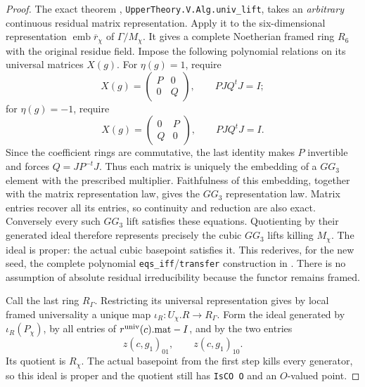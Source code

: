 \begin{proof}
The exact theorem
,
\texttt{UpperTheory.V.Alg.univ\_lift}, takes an
\emph{arbitrary} continuous residual matrix representation.
Apply it to the six-dimensional representation
$\operatorname{emb}\overline r_\chi$ of $\Gamma/M_\chi$.
It gives a complete Noetherian framed ring $R_6$ with the
original residue field.  Impose the following polynomial
relations on its universal matrices $X(g)$.
For $\eta(g)=1$, require
\[
 X(g)=\begin{pmatrix}P&0\\0&Q\end{pmatrix},
                  \qquad P JQ^tJ=I;
                                                                  \tag{G49.8}
\]
for $\eta(g)=-1$, require
\[
 X(g)=\begin{pmatrix}0&P\\Q&0\end{pmatrix},
                  \qquad P JQ^tJ=I.                            \tag{G49.9}
\]
Since the coefficient rings are commutative, the last
identity makes $P$ invertible and forces $Q=JP^{-t}J$.
Thus each matrix is uniquely the embedding of a $GG_3$
element with the prescribed multiplier.  Faithfulness of
this embedding, together with the matrix representation
law, gives the $GG_3$ representation law.  Matrix entries
recover all its entries, so continuity and reduction are
also exact.  Conversely every such $GG_3$ lift satisfies
these equations.  Quotienting by their generated ideal
therefore represents precisely the cubic $GG_3$ lifts
killing $M_\chi$.  The ideal is proper: the actual cubic
basepoint satisfies it.  This rederives, for the new seed,
the complete polynomial \texttt{eqs\_iff}/\texttt{transfer}
construction in .
There is no assumption of absolute residual irreducibility
because the functor remains framed.

Call the last ring $R_\Gamma$.  Restricting its universal
representation gives by local framed universality a unique
map $\iota_R:U_\chi.R\to R_\Gamma$.
Form the ideal generated by $\iota_R(P_\chi)$, by all entries
of $r^{\rm univ}(c).\mathrm{mat}-I$, and by the two entries
\[
                   z(c,g_1)_{01},\qquad z(c,g_1)_{10}.          \tag{G49.10}
\]
Its quotient is $R_\chi$.
The actual basepoint from the first step kills every generator,
so this ideal is proper and the quotient still has
\texttt{IsCO O} and an $O$-valued point.


\end{proof}
